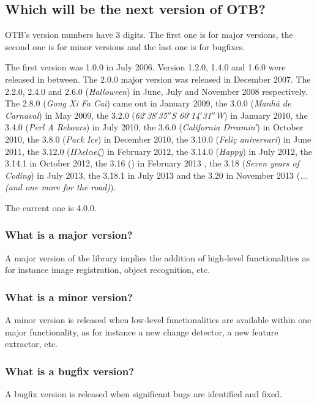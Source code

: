 \subsection{Which will be the next version of OTB?}
OTB's version numbers have 3 digits. The first one is for major
versions, the second one is for minor versions and the last one is for
bugfixes.

The first version was 1.0.0 in July 2006. Version 1.2.0, 1.4.0 and 1.6.0 were
released in between. The 2.0.0 major version  was released in December 2007.
The 2.2.0, 2.4.0 and 2.6.0 ({\em Halloween}) in June, July and November 2008 respectively. The
2.8.0 ({\em Gong Xi Fa Cai}) came out in January 2009, the 3.0.0 ({\em Manh\~{a} de Carnaval}) in May 2009, the 3.2.0 ({\em 62$^\circ$38${'}$35${''}$S 60$^\circ$14${'}$31${''}$W}) in January 2010, the 3.4.0 ({\em Perl A Rebours}) in July 2010, the 3.6.0 ({\em California Dreamin'}) in October 2010, the 3.8.0 ({\em Pack Ice}) in December 2010, the 3.10.0 ({\em Feli\c{c} aniversari}) in June 2011, the 3.12.0 ({\em $\Pi \lambda \epsilon l \alpha \epsilon \zeta$}) in February 2012, the 3.14.0 ({\em Happy}) in July 2012, the 3.14.1 in October 2012, the 3.16 () in February 2013 , the 3.18 ({\em Seven years of Coding}) in July 2013, the 3.18.1 in July 2013 and the 3.20 in November 2013 ({\em ... (and one more for the road)}). 

The current one is 4.0.0.

\subsubsection{What is a major version?}
A major version of the library implies the addition of high-level
functionalities as for instance image registration, object recognition, etc.

\subsubsection{What is a minor version?}
A minor version is released when low-level functionalities are
available within one major functionality, as for instance a new
change detector, a new feature extractor, etc.

\subsubsection{What is a bugfix version?}
A bugfix version is released when significant bugs are identified and fixed.

